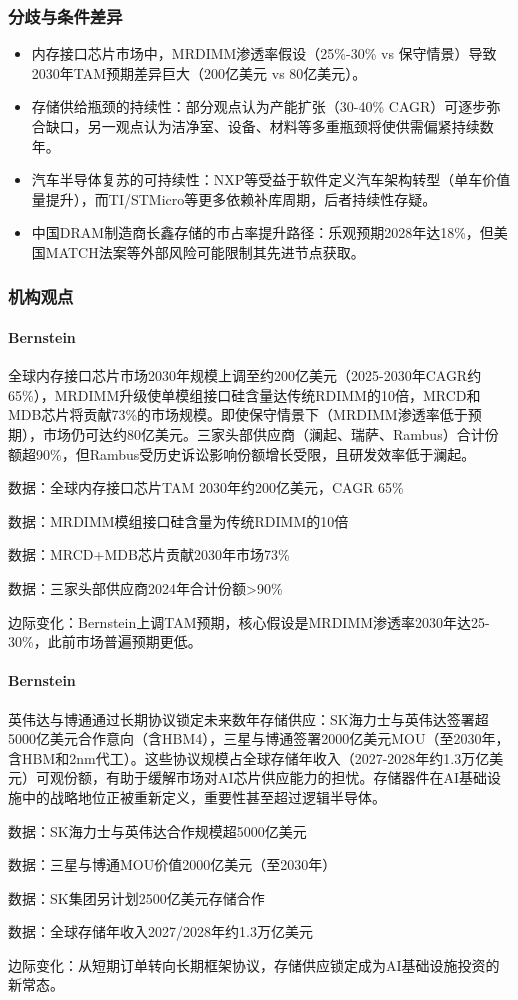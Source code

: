 \documentclass[11pt]{ctexart}
\begin{document}
\subsubsection*{分歧与条件差异}
\begin{itemize}
  \item 内存接口芯片市场中，MRDIMM渗透率假设（25\%-30\% vs 保守情景）导致2030年TAM预期差异巨大（200亿美元 vs 80亿美元）。
  \item 存储供给瓶颈的持续性：部分观点认为产能扩张（30-40\% CAGR）可逐步弥合缺口，另一观点认为洁净室、设备、材料等多重瓶颈将使供需偏紧持续数年。
  \item 汽车半导体复苏的可持续性：NXP等受益于软件定义汽车架构转型（单车价值量提升），而TI/STMicro等更多依赖补库周期，后者持续性存疑。
  \item 中国DRAM制造商长鑫存储的市占率提升路径：乐观预期2028年达18\%，但美国MATCH法案等外部风险可能限制其先进节点获取。
\end{itemize}
\subsubsection*{机构观点}
\paragraph{Bernstein} 全球内存接口芯片市场2030年规模上调至约200亿美元（2025-2030年CAGR约65\%），MRDIMM升级使单模组接口硅含量达传统RDIMM的10倍，MRCD和MDB芯片将贡献73\%的市场规模。即使保守情景下（MRDIMM渗透率低于预期），市场仍可达约80亿美元。三家头部供应商（澜起、瑞萨、Rambus）合计份额超90\%，但Rambus受历史诉讼影响份额增长受限，且研发效率低于澜起。
{\small\color{refgray}数据：全球内存接口芯片TAM 2030年约200亿美元，CAGR 65\%\par}
{\small\color{refgray}数据：MRDIMM模组接口硅含量为传统RDIMM的10倍\par}
{\small\color{refgray}数据：MRCD+MDB芯片贡献2030年市场73\%\par}
{\small\color{refgray}数据：三家头部供应商2024年合计份额>90\%\par}
{\small\color{refgray}边际变化：Bernstein上调TAM预期，核心假设是MRDIMM渗透率2030年达25-30\%，此前市场普遍预期更低。\par}
\paragraph{Bernstein} 英伟达与博通通过长期协议锁定未来数年存储供应：SK海力士与英伟达签署超5000亿美元合作意向（含HBM4），三星与博通签署2000亿美元MOU（至2030年，含HBM和2nm代工）。这些协议规模占全球存储年收入（2027-2028年约1.3万亿美元）可观份额，有助于缓解市场对AI芯片供应能力的担忧。存储器件在AI基础设施中的战略地位正被重新定义，重要性甚至超过逻辑半导体。
{\small\color{refgray}数据：SK海力士与英伟达合作规模超5000亿美元\par}
{\small\color{refgray}数据：三星与博通MOU价值2000亿美元（至2030年）\par}
{\small\color{refgray}数据：SK集团另计划2500亿美元存储合作\par}
{\small\color{refgray}数据：全球存储年收入2027/2028年约1.3万亿美元\par}
{\small\color{refgray}边际变化：从短期订单转向长期框架协议，存储供应锁定成为AI基础设施投资的新常态。\par}
\end{document}
